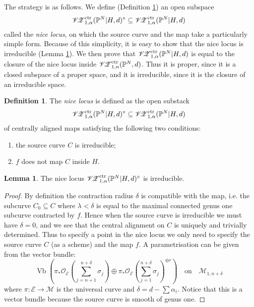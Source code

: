 \documentclass[11pt]{amsart}
\newcommand{\PP}{\mathbb P}
\newcommand{\VZc}[4]{\mathcal{V\!Z}^{\rm{ctr}}_{#1,#2}(#3,#4)}
\newcommand{\OO}{\mathcal{O}}
\renewcommand{\to}{\rightarrow}
\theoremstyle{definition}
\newtheorem{lem}[thm]{Lemma}
\theoremstyle{definition}
\newtheorem{definition}[thm]{Definition}
\begin{document}
The strategy is as follows. We define (Definition \ref{Definition of nice locus}) an open subspace
\begin{equation*}\VZc{1}{\alpha}{\PP^N|H}{d}^{\circ} \subseteq \VZc{1}{\alpha}{\PP^N|H}{d}\end{equation*}
called the \emph{nice locus}, on which the source curve and the map take a particularly simple form. Because of this simplicity, it is easy to show that the nice locus is irreducible (Lemma \ref{Nice locus is irreducible}). We then prove that $\VZc{1}{\alpha}{\PP^N|H}{d}$ is equal to the closure of the nice locus inside $\VZc{1}{n}{\PP^N}{d}$. Thus it is proper, since it is a closed subspace of a proper space, and it is irreducible, since it is the closure of an irreducible space.

\begin{definition} \label{Definition of nice locus} The \emph{nice locus} is defined as the open substack
\begin{equation*}\VZc{1}{\alpha}{\PP^N|H}{d}^{\circ} \subseteq \VZc{1}{\alpha}{\PP^N|H}{d}\end{equation*}
of centrally aligned maps satisfying the following two conditions:
\begin{enumerate}
\item the source curve $C$ is irreducible;
\item $f$ does not map $C$ inside $H$.
\end{enumerate}
\end{definition}

\begin{lem}\label{Nice locus is irreducible}
The nice locus $\VZc{1}{\alpha}{\PP^N|H}{d}^{\circ}$ is irreducible.
\end{lem}
\begin{proof}
By definition the contraction radius $\delta$ is compatible with the map, i.e. the subcurve $C_0\subseteq C$ where $\lambda<\delta$ is equal to the maximal connected genus one subcurve contracted by $f$. Hence when the source curve is irreducible we must have $\delta=0$, and we see that the central alignment on $C$ is uniquely and trivially determined. Thus to specify a point in the nice locus we only need to specify the source curve $C$ (as a scheme) and the map $f$. A parametrisation can be given from the vector bundle:
\[ \operatorname{Vb}\left(\pi_*\OO_{\mathcal E}(\sum_{j=n+1}^{n+\delta}\sigma_j)\oplus\pi_*\OO_{\mathcal E}(\sum_{j=1}^{n+\delta}\sigma_j)^{\oplus r}\right) \quad \text{on} \quad \mathcal{M}_{1,n+\delta}\]
where $\pi\colon\mathcal E\to\mathcal M$ is the universal curve and $\delta=d-\sum\alpha_i$. Notice that this is a vector bundle because the source curve is smooth of genus one.
\end{proof}
\end{document}
